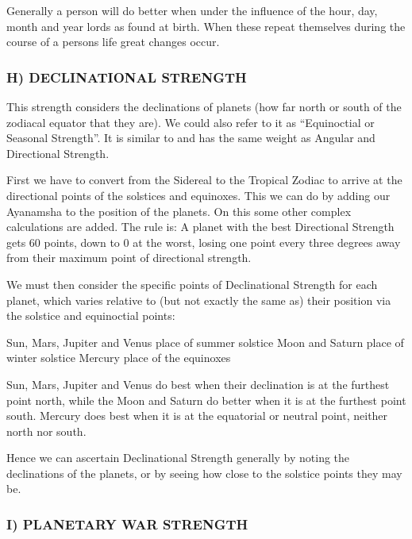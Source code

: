  

Generally a person will do better when under the influence of the hour, day, month and year lords as found at birth. When these repeat themselves during the course of a persons life great changes occur.

 

\subsubsection{H) DECLINATIONAL STRENGTH}

 

This strength considers the declinations of planets (how far north or south of the zodiacal equator that they are). We could also refer to it as “Equinoctial or Seasonal Strength”. It is similar to and has the same weight as Angular and Directional Strength.

 

First we have to convert from the Sidereal to the Tropical Zodiac to arrive at the directional points of the solstices and equinoxes. This we can do by adding our Ayanamsha to the position of the planets. On this some other complex calculations are added. The rule is: A planet with the best Directional Strength gets 60 points, down to 0 at the worst, losing one point every three degrees away from their maximum point of directional strength.

 

We must then consider the specific points of Declinational Strength for each planet, which varies relative to (but not exactly the same as) their position via the solstice and equinoctial points:

 

Sun, Mars, Jupiter and Venus	 place of summer solstice
Moon and Saturn	 place of winter solstice
Mercury	 place of the equinoxes
 

Sun, Mars, Jupiter and Venus do best when their declination is at the furthest point north, while the Moon and Saturn do better when it is at the furthest point south. Mercury does best when it is at the equatorial or neutral point, neither north nor south.

 

Hence we can ascertain Declinational Strength generally by noting the declinations of the planets, or by seeing how close to the solstice points they may be.

 

\subsubsection{I) PLANETARY WAR STRENGTH}

